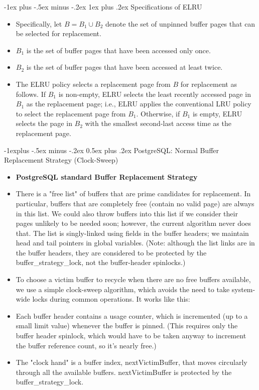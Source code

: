 \documentclass[10pt, landscape]{article}
\makeatletter
\renewcommand{\subsection}{\@startsection{subsection}{2}{0mm}%
                                {-1explus -.5ex minus -.2ex}%
                                {0.5ex plus .2ex}%
                                {\normalfont\normalsize\bfseries}}
\renewcommand{\subsubsection}{\@startsection{subsubsection}{3}{0mm}%
                                {-1ex plus -.5ex minus -.2ex}%
                                {1ex plus .2ex}%
                                {\normalfont\small\bfseries}}
\makeatother
\begin{document}
\begin{multicols*}{3}
\subsubsection{Specifications of ELRU}
\begin{itemize}
\item Specifically, let $B = B_1 \cup B_2$ denote the set of unpinned buffer pages that can be selected for replacement.
\item $B_1$  is the set of buffer pages that have been accessed only once.
\item $B_2$  is the set of buffer pages that have been accessed at least twice. 
\item The ELRU policy selects a replacement page from $B$ for replacement as follows. If $B_1$ is non-empty, ELRU selects the least recently accessed page in $B_1$
 as the replacement page; i.e., ELRU applies the conventional LRU policy to select the replacement page from $B_1$. Otherwise, if $B_1$ is empty, ELRU selects the page in $B_2$
 with the smallest second-last access time as the replacement page.
\end{itemize}


\null \null \null \null
\columnbreak

\subsection{PostgreSQL:  Normal Buffer Replacement Strategy (Clock-Sweep)}
\begin{itemize}
\item \textbf{PostgreSQL standard Buffer Replacement Strategy}
\item There is a "free list" of buffers that are prime candidates for replacement.
In particular, buffers that are completely free (contain no valid page) are
always in this list.  We could also throw buffers into this list if we
consider their pages unlikely to be needed soon; however, the current
algorithm never does that.  The list is singly-linked using fields in the
buffer headers; we maintain head and tail pointers in global variables.
(Note: although the list links are in the buffer headers, they are
considered to be protected by the buffer\_strategy\_lock, not the buffer-header
spinlocks.)  
\item To choose a victim buffer to recycle when there are no free
buffers available, we use a simple clock-sweep algorithm, which avoids the
need to take system-wide locks during common operations.  It works like
this:
\item Each buffer header contains a usage counter, which is incremented (up to a
small limit value) whenever the buffer is pinned.  (This requires only the
buffer header spinlock, which would have to be taken anyway to increment the
buffer reference count, so it's nearly free.)
\item The "clock hand" is a buffer index, nextVictimBuffer, that moves circularly
through all the available buffers.  nextVictimBuffer is protected by the
buffer\_strategy\_lock.
\end{itemize}


\end{multicols*}
\end{document}
